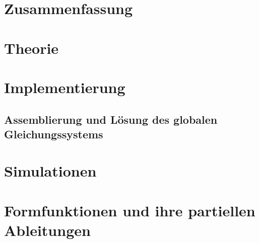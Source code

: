 \documentclass[12pt,a4paper]{scrartcl}
\begin{document}




\section*{Zusammenfassung}



\section{Theorie}








\section{Implementierung}








\subsection{Assemblierung und Lösung des globalen Gleichungssystems}
\label{sec:assembling}


\section{Simulationen}


\appendix
\section{Formfunktionen und ihre partiellen Ableitungen}





\newpage
{}

\end{document}
